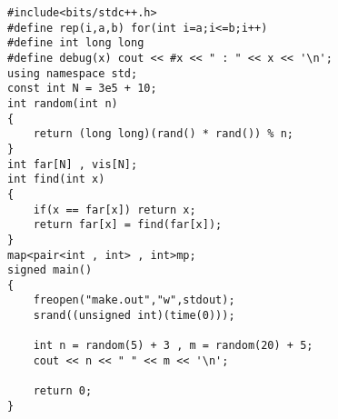 \documentclass[E:/GsjzTle/main/main.tex]{subfiles}
\begin{document}
\begin{lstlisting}
#include<bits/stdc++.h>
#define rep(i,a,b) for(int i=a;i<=b;i++)
#define int long long
#define debug(x) cout << #x << " : " << x << '\n';
using namespace std;
const int N = 3e5 + 10;
int random(int n)
{
	return (long long)(rand() * rand()) % n;
}
int far[N] , vis[N];
int find(int x)
{
	if(x == far[x]) return x;
	return far[x] = find(far[x]);
}
map<pair<int , int> , int>mp;
signed main()
{
	freopen("make.out","w",stdout);
	srand((unsigned int)(time(0)));
	
	int n = random(5) + 3 , m = random(20) + 5;
	cout << n << " " << m << '\n';
	
	return 0;
}
\end{lstlisting}
\end{document}

